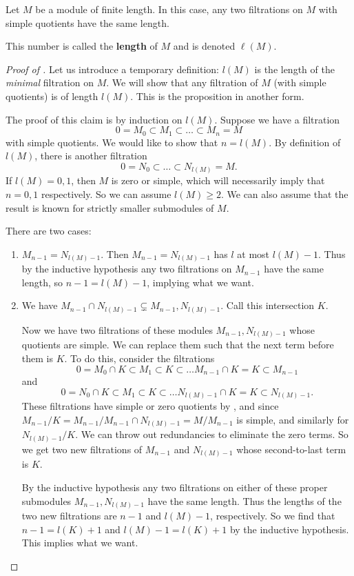 \begin{theorem}\label{lengthexists} Let $M$ be a module of
finite length.
In this case, any two filtrations
on $M$ with simple quotients have the same length.
\end{theorem} 
\begin{definition} 
This number is called the \textbf{length} of $M$ and is denoted $\ell(M)$.
\end{definition} 
\begin{proof}[Proof of ] 
Let us introduce a temporary definition: $l(M)$ is the length of the
\emph{minimal} filtration on $M$. We will show that any filtration of $M$ (with
simple quotients) is of length
$l(M)$. This is the proposition in another form.

The proof of this claim is by induction on $l(M)$. Suppose we have a filtration
\[ 0 = M_0 \subset M_1 \subset \dots \subset M_n = M  \]
with simple quotients. We would like to show that $n  = l(M)$. By definition of
$l(M)$, there is another filtration
\[ 0 = N_0 \subset \dots \subset N_{l(M)} = M.  \]
If $l(M) = 0,1$, then $M$ is zero or simple, which will necessarily imply that $n=0,1$
respectively. So we can assume $l(M)  \geq 2$. We can also assume that the
result is known for strictly smaller submodules of $M$.

There are two cases:
\begin{enumerate}
\item $M_{n-1} = N_{l(M) -1 } $. Then $M_{n-1} = N_{l(M)-1}$ has $l$ at most
$l(M)-1$. Thus by the inductive hypothesis any two filtrations on $M_{n-1}$
have the same length, so $n-1 = l(M) -1$, implying what we want. 
\item We have $M_{n-1} \cap N_{l(M) - 1} \subsetneq M_{n-1}, N_{l(M)-1}$. 
Call this intersection $K$. 

Now we have two  filtrations of these modules $M_{n-1}, N_{l(M)-1}$ whose
quotients are simple. We can replace them such that the next
term before them is $K$. 
To do this, consider the filtrations
\[ 0 = M_0 \cap K \subset M_1 \subset K \subset \dots M_{n-1} \cap K = K
\subset M_{n-1}  \]
and
\[ 0 = N_0 \cap K \subset M_1 \subset K \subset \dots N_{l(M)-1} \cap K = K
\subset N_{l(M)-1} . \]
These filtrations have simple or zero quotients by
, and since $ M_{n-1}/K =
M_{n-1}/M_{n-1} \cap N_{l(M)-1} = M/M_{n-1}$ is simple, and similarly for
$N_{l(M)-1}/K$. We can throw out redundancies to eliminate
the zero terms. 
So we get two new filtrations of $M_{n-1}$ and $N_{l(M)-1}$ whose second-to-last
term is $K$.

By the
inductive hypothesis any two filtrations on either of these proper submodules $M_{n-1},
N_{l(M)-1} $
have the same length. 
Thus the lengths of the two new filtrations are $n-1$ and $l(M)-1$,
respectively.
So we find that $n-1 = l(K) +1$ and $l(M)-1 = l(K)+1$ by
the inductive hypothesis. This implies what we want.
\end{enumerate}
\end{proof} 

